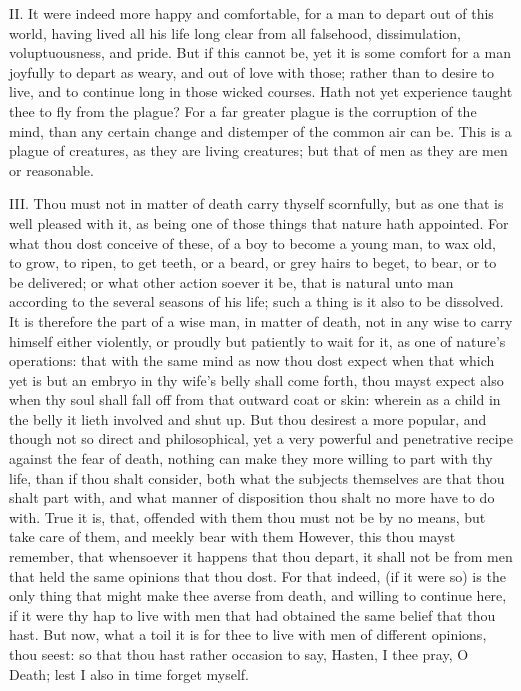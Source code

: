 II. It were indeed more happy and comfortable, for a man to depart out
of this world, having lived all his life long clear from all falsehood,
dissimulation, voluptuousness, and pride. But if this cannot be, yet it is
some comfort for a man joyfully to depart as weary, and out of love with
those; rather than to desire to live, and to continue long in those wicked
courses. Hath not yet experience taught thee to fly from the plague? For a
far greater plague is the corruption of the mind, than any certain change
and distemper of the common air can be. This is a plague of creatures, as
they are living creatures; but that of men as they are men or reasonable.

III. Thou must not in matter of death carry thyself scornfully, but as
one that is well pleased with it, as being one of those things that nature
hath appointed. For what thou dost conceive of these, of a boy to become a
young man, to wax old, to grow, to ripen, to get teeth, or a beard, or
grey hairs to beget, to bear, or to be delivered; or what other action
soever it be, that is natural unto man according to the several seasons of
his life; such a thing is it also to be dissolved. It is therefore the
part of a wise man, in matter of death, not in any wise to carry himself
either violently, or proudly but patiently to wait for it, as one of
nature's operations: that with the same mind as now thou dost expect when
that which yet is but an embryo in thy wife's belly shall come forth, thou
mayst expect also when thy soul shall fall off from that outward coat or
skin: wherein as a child in the belly it lieth involved and shut up. But
thou desirest a more popular, and though not so direct and philosophical,
yet a very powerful and penetrative recipe against the fear of death,
nothing can make they more willing to part with thy life, than if thou
shalt consider, both what the subjects themselves are that thou shalt part
with, and what manner of disposition thou shalt no more have to do with.
True it is, that, offended with them thou must not be by no means, but
take care of them, and meekly bear with them However, this thou mayst
remember, that whensoever it happens that thou depart, it shall not be
from men that held the same opinions that thou dost. For that indeed, (if
it were so) is the only thing that might make thee averse from death, and
willing to continue here, if it were thy hap to live with men that had
obtained the same belief that thou hast. But now, what a toil it is for
thee to live with men of different opinions, thou seest: so that thou hast
rather occasion to say, Hasten, I thee pray, O Death; lest I also in time
forget myself.

